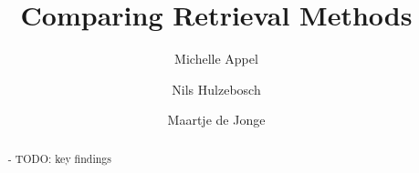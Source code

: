 \documentclass[sigconf]{acmart}
\begin{document}
\title{Comparing Retrieval Methods}


\author{Michelle Appel}
\affiliation{%
}

\author{Nils Hulzebosch}

\author{Maartje de Jonge}




\begin{abstract}

- TODO: key findings

\end{abstract}

%
%




\maketitle





\end{document}
